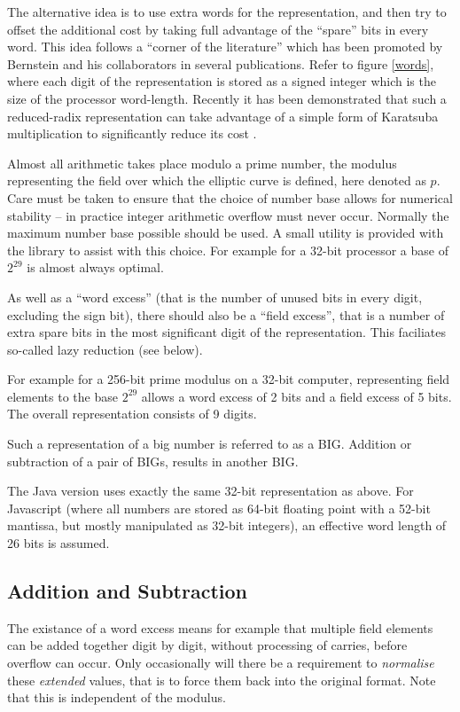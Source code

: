 \documentclass{llncs}
\begin{document}
The alternative idea is to use extra words for the representation, and then try to offset the additional cost by taking full advantage of the ``spare'' bits in every word. 
This idea follows a ``corner of the literature'' \cite{bernstein-chuengsatiansup-lange} which has been promoted by Bernstein and his collaborators in several publications.
Refer to figure \ref{words}, where each digit of the representation is stored as a signed integer which is the size of the processor word-length. Recently it has been 
demonstrated that such a reduced-radix representation can take advantage of a simple form of Karatsuba multiplication to significantly reduce its cost \cite{scott2}. 

Almost all arithmetic takes place modulo a prime number, the modulus representing the field over which the elliptic curve is defined, here denoted as $p$.
Care must be taken to ensure that the choice of number base allows for numerical stability -- in practice integer arithmetic overflow must never occur. Normally the maximum
number base possible should be used. A small utility is provided with the library to assist with this choice. For example for a 32-bit processor a base of $2^{29}$ is almost
always optimal.

As well as a ``word excess'' (that is the number of unused bits in every digit, excluding the sign bit), there should also be a ``field excess'', that is a number of extra spare bits in the most 
significant digit of the representation. This faciliates so-called lazy reduction (see below).

For example for a 256-bit prime modulus on a 32-bit computer, representing field elements to the base $2^{29}$ allows a word excess of 2 bits and a field excess of 5 bits. The overall
representation consists of 9 digits.

Such a representation of a big number is referred to as a {BIG}. Addition or subtraction of a pair of {BIG}s, results in another {BIG}.

The Java version uses exactly the same 32-bit representation as above. For Javascript (where all numbers are stored as 64-bit floating point with a 52-bit mantissa, but mostly 
manipulated as 32-bit integers), an effective word length of 26 bits is assumed.

\subsection{Addition and Subtraction}

The existance of a word excess means for example that multiple field elements can be added together digit by digit, without processing of carries, before overflow can occur. 
Only occasionally will there be a requirement to {\it normalise} these {\it extended} values,  that is to force them back into the original format. Note that this is independent of the modulus.
\end{document}
